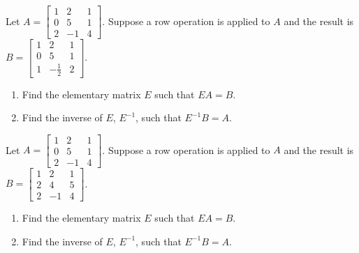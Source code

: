 \documentclass{ximera}
\begin{document}
\begin{problem}\label{prb:4.59}
Let $A = \left[ \begin{array}{rrr}
1 & 2 & 1  \\
0 & 5 & 1 \\
2 & -1 & 4
\end{array}\right]$. Suppose a row operation is applied to $A$ and the result is $B = \left[ \begin{array}{rrr}
1 & 2 & 1\\
0 & 5 & 1 \\
1 & - \frac{1}{2} & 2
\end{array}\right]$.
\begin{enumerate}
\item Find the elementary matrix $E$ such that $EA = B$.

\item Find the inverse of $E$, $E^{-1}$, such that $E^{-1}B = A$.
\end{enumerate}
\end{problem}


\begin{problem}\label{prb:4.60}
Let $A = \left[ \begin{array}{rrr}
1 & 2 & 1  \\
0 & 5 & 1 \\
2 & -1 & 4
\end{array}\right]$. Suppose a row operation is applied to $A$ and the result is $B = \left[ \begin{array}{rrr}
1 & 2 & 1\\
2 & 4 & 5 \\
2 & -1 & 4
\end{array}\right]$.
\begin{enumerate}
\item Find the elementary matrix $E$ such that $EA = B$.

\item Find the inverse of $E$, $E^{-1}$, such that $E^{-1}B = A$.
\end{enumerate}
\end{problem}
\end{document}
